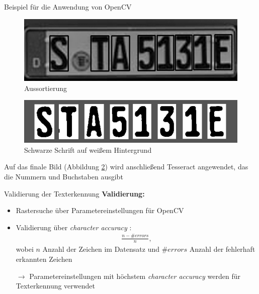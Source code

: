 \begin{frame}{Beispiel für die Anwendung von OpenCV}

\begin{figure}
\begin{center}
\includegraphics[scale=0.25]{bilder/Nummer_5_Aussortieren.png}
\caption{Aussortierung}
\label{Aussortierung}
\end{center}
\end{figure}

\begin{figure}
\begin{center}
\includegraphics[scale=0.25]{bilder/Nummer_6_SchwarzWeiss.png}
\caption{Schwarze Schrift auf weißem Hintergrund}
\label{SchwarzWeiss}
\end{center}
\end{figure}

Auf das finale Bild (Abbildung \ref{SchwarzWeiss}) wird anschließend Tesseract angewendet, das die Nummern und Buchstaben ausgibt
\end{frame}

\begin{frame}{Validierung der Texterkennung}
    \textbf{Validierung:}
    \begin{itemize}
    \item Rastersuche über Parametereinstellungen für OpenCV
    \item Validierung über \textit{character accuracy} \cite{ocr_accuracy}:
    \begin{align*}
    \frac{n - \# \textit{errors}}{n},
    \end{align*}
    wobei $n$ Anzahl der Zeichen im Datensatz und $\# \textit{errors}$ Anzahl der fehlerhaft erkannten Zeichen 
    \item[$\rightarrow$] Parametereinstellungen mit höchstem \textit{character accuracy} werden für Texterkennung verwendet
    \end{itemize}
\end{frame}
